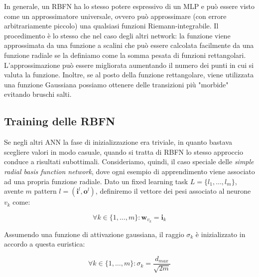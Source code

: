 \documentclass[10pt,a4paper]{article}
\newcommand{\ww}{\mathbf{w}}
\newcommand{\ii}{\mathbf{i}}
\newcommand{\oo}{\mathbf{o}}
\begin{document}
In generale, un RBFN ha lo stesso potere espressivo di un MLP e può essere visto come un approssimatore universale, ovvero può approssimare (con errore arbitrariamente piccolo) una qualsiasi funzioni Riemann-integrabile. Il procedimento è lo stesso che nel caso degli altri network: la funzione viene approssimata da una funzione a scalini che può essere calcolata facilmente da una funzione radiale se la definiamo come la somma pesata di funzioni rettangolari. L'approssimazione può essere migliorata aumentando il numero dei punti in cui si valuta la funzione. Inoltre, se al posto della funzione rettangolare, viene utilizzata una funzione Gaussiana possiamo ottenere delle transizioni più "morbide" evitando bruschi salti. 

\subsection{Training delle RBFN}

Se negli altri ANN la fase di inizializzazione era triviale, in quanto bastava scegliere valori in modo casuale, quando si tratta di RBFN lo stesso approccio conduce a risultati subottimali. Consideriamo, quindi, il caso speciale delle \emph{simple radial basis function network}, dove ogni esempio di apprendimento viene associato ad una propria funzione radiale. Dato un fixed learning task $L = \{l_1,\dots,l_m\}$, avente $m$ pattern $l = (\ii^l,\oo^l)$, definiremo il vettore dei pesi associato al neurone $v_k$ come:

$$
\forall k \in \{1,\dots,m\}: \ww_{v_k} = \ii_k
$$

Assumendo una funzione di attivazione gaussiana, il raggio $\sigma_k$ è inizializzato in accordo a questa euristica:

$$
\forall k \in \{1,\dots,m\}: \sigma_k = \frac{d_{max}}{\sqrt{2m}}
$$
\end{document}
